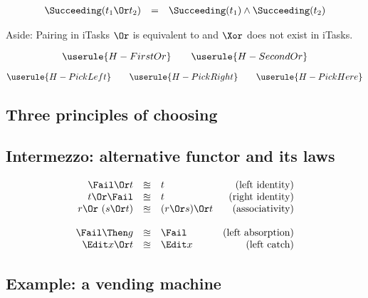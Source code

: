 \begin{equation*}
  \begin{array}{lcl}
    \Succeeding(t_1 \Or t_2) &=& \Succeeding(t_1) \land \Succeeding(t_2)
  \end{array}
\end{equation*}

\begin{margintext}{Aside: Pairing in iTasks}
  $\Or$ is equivalent to \type{-||-}
  and $\Xor$ does not exist in iTasks.
\end{margintext}

\begin{equation*}
  \userule{H-FirstOr} \qquad \userule{H-SecondOr}
\end{equation*}

\begin{equation*}
  \userule{H-PickLeft} \qquad \userule{H-PickRight} \qquad \userule{H-PickHere}
\end{equation*}


\subsection{Three principles of choosing}


\subsection{Intermezzo: alternative functor and its laws}

\begin{equation*}
  \begin{array}{rclr}
    \Fail \Or t
      &\approxeq& t
      & \text{(left identity)} \\
    t \Or \Fail
      &\approxeq& t
      & \text{(right identity)} \\
    r \Or\ (s \Or t)
      &\approxeq& (r \Or s) \Or t
      & \text{(associativity)} \\
    & & & \\
    \Fail \Then g
      &\approxeq& \Fail
      & \text{(left absorption)} \\
    \Edit x \Or t
      &\approxeq& \Edit x
      & \text{(left catch)}
  \end{array}
\end{equation*}



\subsection{Example: a vending machine}

